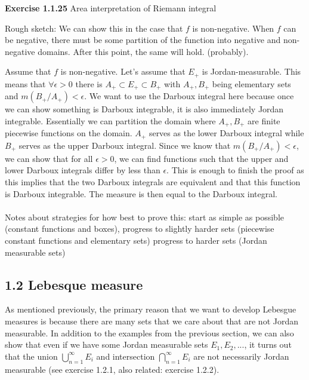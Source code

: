 \documentclass[answers,12pt]{exam}
\begin{document}
\textbf{Exercise 1.1.25} Area interpretation of Riemann integral
\begin{solution}
    Rough sketch:
    We can show this in the case that $f$ is non-negative.
    When $f$ can be negative, there must be some partition of the function into negative and non-negative domains.
    After this point, the same will hold. (probably).

    Assume that $f$ is non-negative.
    Let's assume that $E_+$ is Jordan-measurable.
    This means that $\forall \epsilon >0$ there is $A_+ \subset E_+ \subset B_+$ with $A_+, B_+$ being elementary sets and $m(B_+/A_+) < \epsilon$.
    We want to use the Darboux integral here because once we can show something is Darboux integrable, it is also immediately Jordan integrable.
    Essentially we can partition the domain where $A_+, B_+$ are finite piecewise functions on the domain.
    $A_+$ serves as the lower Darboux integral while $B_+$ serves as the upper Darboux integral.
    Since we know that $m(B_+/A_+) < \epsilon$, we can show that for all $\epsilon > 0$, we can find functions such that the upper and lower Darboux integrals differ by less than $\epsilon$.
    This is enough to finish the proof as this implies that the two Darboux integrals are equivalent and that this function is Darboux integrable.
    The measure is then equal to the Darboux integral. \\ \\

    Notes about strategies for how best to prove this:
    start as simple as possible (constant functions and boxes),
    progress to slightly harder sets (piecewise constant functions and elementary sets)
    progress to harder sets (Jordan measurable sets)
\end{solution}


\subsection{1.2 Lebesque measure}
As mentioned previously, the primary reason that we want to develop Lebesgue measures is because there are many sets that we care about that are not Jordan measurable.
In addition to the examples from the previous section, we can also show that even if we have some Jordan measurable sets $E_1,E_2, ...$, it turns out that the union $\bigcup_{n=1}^{\infty} E_i$ and intersection $\bigcap_{n=1}^{\infty} E_i$ are not necessarily Jordan measurable (see exercise 1.2.1, also related: exercise 1.2.2). 
\end{document}
